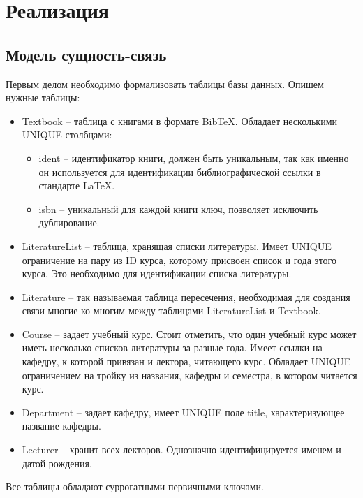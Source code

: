 \section*{Реализация}

\subsection*{Модель сущность-связь}

Первым делом необходимо формализовать таблицы базы данных. Опишем нужные таблицы:

\begin{itemize}
	\item Textbook -- таблица с книгами в формате BibTeX. Обладает несколькими UNIQUE столбцами:
	      \begin{itemize}
	      	\item ident -- идентификатор книги, должен быть уникальным, так как именно
	      	      он используется для идентификации библиографической ссылки в стандарте LaTeX.
	      	\item isbn -- уникальный для каждой книги ключ, позволяет исключить дублирование.
	      \end{itemize}
	\item LiteratureList -- таблица, хранящая списки литературы. Имеет UNIQUE ограничение на
	      пару из ID курса, которому присвоен список и года этого курса. Это необходимо для
	      идентификации списка литературы.
	\item Literature -- так называемая таблица пересечения, необходимая для создания связи
	      многие-ко-многим между таблицами LiteratureList и Textbook.
	\item Course -- задает учебный курс. Стоит отметить, что один учебный курс может иметь
	      несколько списков литературы за разные года. Имеет ссылки на кафедру, к которой 
	      привязан и лектора, читающего курс. Обладает UNIQUE ограничением на тройку из
	      названия, кафедры и семестра, в котором читается курс.
	\item Department -- задает кафедру, имеет UNIQUE поле title, характеризующее
	      название кафедры.
	\item Lecturer -- хранит всех лекторов. Однозначно идентифицируется именем и датой рождения.
\end{itemize}

Все таблицы обладают суррогатными первичными ключами.

